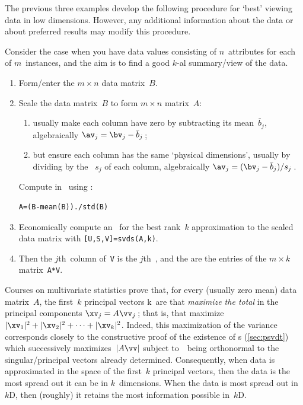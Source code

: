 The previous three examples develop the following procedure for `best' viewing data in low dimensions.
However, any additional information about the data or about preferred results may modify this procedure. 


\begin{procedure} \label{pro:pca}
Consider the case when you have data values consisting of \(n\)~attributes for each of \(m\)~instances, and the aim is to find a good \(k\)-al summary\slash view of the data. 
\begin{enumerate}
\item Form\slash enter the \(m\times n\) data matrix~\(B\).
\item {}Scale the data matrix~\(B\) to form \(m\times n\) matrix~\(A\):
\begin{enumerate}
\item usually make each column have zero  by subtracting its mean~\(\bar b_j\), algebraically \(\av_j=\bv_j-\bar b_j\)\,;
\item but ensure each column has the same `physical dimensions', usually by dividing by the ~\(s_j\) of each column, algebraically \(\av_j=(\bv_j-\bar b_j)/s_j\)\,.
\end{enumerate}
Compute in \script\ using :
\begin{verbatim}
A=(B-mean(B))./std(B)
\end{verbatim}

\item  Economically compute an \svd\ for the best rank~\(k\) approximation to the scaled data matrix with \verb|[U,S,V]=svds(A,k)|.
\item Then the \(j\)th~column of~\verb|V| is the \(j\)th~, and the  are the entries of the \(m\times k\) matrix~\verb|A*V|.
\end{enumerate}
\end{procedure}




Courses on multivariate statistics prove that, for every (usually zero mean) data matrix~\(A\), the first~\(k\) principal vectors \hlist\vv k\ are  that \emph{maximize the total } in the principal components \(\xv_j=A\vv_j\)\,; that is, that maximize \(|\xv_1|^2+|\xv_2|^2+\cdots+|\xv_k|^2\).
Indeed, this maximization of the variance corresponds closely to the constructive proof of the existence of \svd{}s (\cref{sec:psvdt}) which successively maximizes~\(|A\vv|\) subject to~\vv\ being orthonormal to the singular\slash principal vectors already determined.
Consequently, when data is approximated in the space of the first~\(k\) principal vectors, then the data is the most spread out it can be in \(k\)~dimensions.
When the data is most spread out in~\(k\)D, then (roughly) it retains the most information possible in~\(k\)D.


